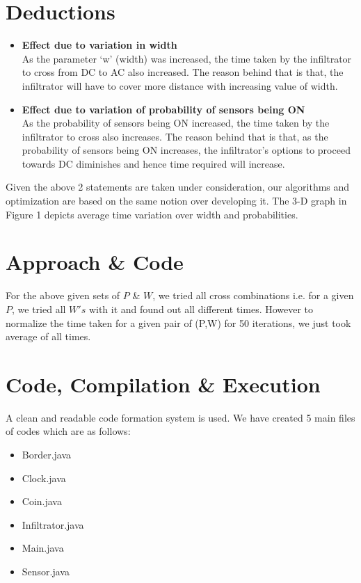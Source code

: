 \documentclass[12pt]{article}
\begin{document}

\section{Deductions}

\begin{itemize}
    \item \textbf{Effect due to variation in width} \\
    As the parameter ‘w’ (width) was increased, the time taken by the infiltrator to cross from DC to AC also increased. The reason behind that is that, the infiltrator will have to cover more distance with increasing value of width.
    \item \textbf{Effect due to variation of probability of sensors being ON} \\
    As the probability of sensors being ON increased, the time taken by the infiltrator to cross also increases. The reason behind that is that, as the probability of sensors being ON increases, the infiltrator's options to proceed towards DC diminishes and hence time required will increase.
\end{itemize}

Given the above 2 statements are taken under consideration, our algorithms and optimization are based on the same notion over developing it. The 3-D graph in Figure 1 depicts average time variation over width and probabilities.

\section{Approach \& Code}
For the above given sets of $P$ \& $W$, we tried all cross combinations i.e. for a given $P$, we tried all $W's$ with it and found out all different times. However to normalize the time taken for a given pair of (P,W) for 50 iterations, we just took average of all times.


\section{Code, Compilation \& Execution}
A clean and readable code formation system is used. We have created 5 main files of codes which are as follows:
    \begin{itemize}
        \item Border.java
        \item Clock.java
        \item Coin.java
        \item Infiltrator.java
        \item Main.java
        \item Sensor.java
    \end{itemize}
\end{document}
